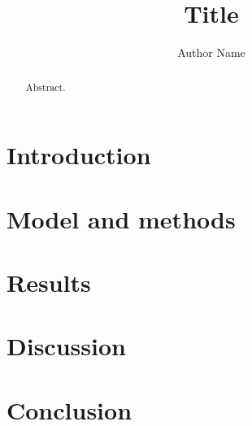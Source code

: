 \documentclass[aps,prl,reprint,nofootinbib]{revtex4-2}
\begin{document}
\title{Title}
\author{Author Name}
\begin{abstract}Abstract.\end{abstract}
\maketitle
\section{Introduction}
\section{Model and methods}
\section{Results}
\section{Discussion}
\section{Conclusion}


\end{document}
